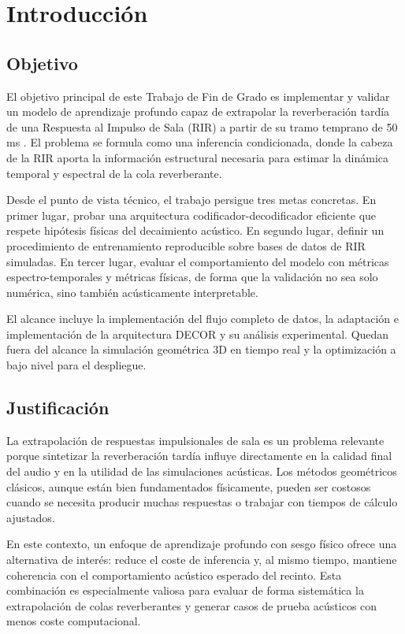 
\chapter{Introducción}

\section{Objetivo}

El objetivo principal de este Trabajo de Fin de Grado es implementar y validar un modelo de aprendizaje profundo capaz de extrapolar la reverberación tardía de una Respuesta al Impulso de Sala (RIR) a partir de su tramo temprano de 50 ms \cite{Lin25}. El problema se formula como una inferencia condicionada, donde la cabeza de la RIR aporta la información estructural necesaria para estimar la dinámica temporal y espectral de la cola reverberante.

Desde el punto de vista técnico, el trabajo persigue tres metas concretas. En primer lugar, probar una arquitectura codificador-decodificador eficiente que respete hipótesis físicas del decaimiento acústico. En segundo lugar, definir un procedimiento de entrenamiento reproducible sobre bases de datos de RIR simuladas. En tercer lugar, evaluar el comportamiento del modelo con métricas espectro-temporales y métricas físicas, de forma que la validación no sea solo numérica, sino también acústicamente interpretable.

El alcance incluye la implementación del flujo completo de datos, la adaptación e implementación de la arquitectura DECOR y su análisis experimental. Quedan fuera del alcance la simulación geométrica 3D en tiempo real y la optimización a bajo nivel para el despliegue.

\section{Justificación}

La extrapolación de respuestas impulsionales de sala es un problema relevante porque sintetizar la reverberación tardía influye directamente en la calidad final del audio y en la utilidad de las simulaciones acústicas. Los métodos geométricos clásicos, aunque están bien fundamentados físicamente, pueden ser costosos cuando se necesita producir muchas respuestas o trabajar con tiempos de cálculo ajustados.

En este contexto, un enfoque de aprendizaje profundo con sesgo físico ofrece una alternativa de interés: reduce el coste de inferencia y, al mismo tiempo, mantiene coherencia con el comportamiento acústico esperado del recinto. Esta combinación es especialmente valiosa para evaluar de forma sistemática la extrapolación de colas reverberantes y generar casos de prueba acústicos con menos coste computacional.

